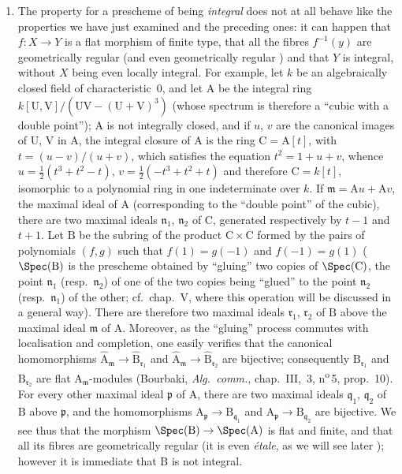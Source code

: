 \begin{remarks}[6.5.5]
\begin{enumerate}[label=(\roman*)]
  \item The property for a prescheme of being \emph{integral} does not at all behave like the properties we have just examined and the preceding ones: it can happen that $f:X\to Y$ is a flat morphism of finite type, that all the fibres $f^{-1}(y)$ are geometrically regular (and even geometrically regular ) and that $Y$ is integral, without $X$ being even locally integral.
For example, let $k$ be an algebraically closed field of characteristic~$0$, and let $\mathrm{A}$ be the integral ring $k[\mathrm{U},\mathrm{V}]/(\mathrm{U}\mathrm{V}-(\mathrm{U}+\mathrm{V})^3)$ (whose spectrum is therefore a ``cubic with a double point''); $\mathrm{A}$ is not integrally closed, and if $u$, $v$ are the canonical images of $\mathrm{U}$, $\mathrm{V}$ in $\mathrm{A}$, the integral closure of $\mathrm{A}$ is the ring $\mathrm{C}=\mathrm{A}[t]$, with $t=(u-v)/(u+v)$, which satisfies the equation $t^2=1+u+v$, whence $u=\frac{1}{2}(t^3+t^2-t)$, $v=\frac{1}{2}(-t^3+t^2+t)$ and therefore $\mathrm{C}=k[t]$, isomorphic to a polynomial ring in one indeterminate over $k$.
If $\mathfrak{m}=\mathrm{A} u+\mathrm{A} v$, the maximal ideal of $\mathrm{A}$ (corresponding to the ``double point'' of the cubic), there are two maximal ideals $\mathfrak{n}_1$, $\mathfrak{n}_2$ of $\mathrm{C}$, generated respectively by $t-1$ and $t+1$.
Let $\mathrm{B}$ be the subring of the product $\mathrm{C}\times\mathrm{C}$ formed by the pairs of polynomials $(f,g)$ such that $f(1)=g(-1)$ and $f(-1)=g(1)$ ($\Spec(\mathrm{B})$ is the prescheme obtained by ``gluing'' two copies of $\Spec(\mathrm{C})$, the point $\mathfrak{n}_1$ (resp.\ $\mathfrak{n}_2$) of one of the two copies being ``glued'' to the point $\mathfrak{n}_2$ (resp.\ $\mathfrak{n}_1$) of the other; cf.\ chap.~V, where this operation will be discussed in a general way).
There are therefore two maximal ideals $\mathfrak{r}_1$, $\mathfrak{r}_2$ of $\mathrm{B}$ above the maximal ideal $\mathfrak{m}$ of $\mathrm{A}$.
Moreover, as the ``gluing'' process commutes with localisation and completion, one easily verifies that the canonical homomorphisms $\hat{\mathrm{A}}_\mathfrak{m}\to\hat{\mathrm{B}}_{\mathfrak{r}_1}$ and $\hat{\mathrm{A}}_\mathfrak{m}\to\hat{\mathrm{B}}_{\mathfrak{r}_2}$ are bijective; consequently $\mathrm{B}_{\mathfrak{r}_1}$ and $\mathrm{B}_{\mathfrak{r}_2}$ are flat $\mathrm{A}_\mathfrak{m}$-modules (Bourbaki, \emph{Alg.\ comm.}, chap.~III, \textsection\,3, n\textsuperscript{o}\,5, prop.~10).
For every other maximal ideal $\mathfrak{p}$ of $\mathrm{A}$, there are two maximal ideals $\mathfrak{q}_1$, $\mathfrak{q}_2$ of $\mathrm{B}$ above $\mathfrak{p}$, and the homomorphisms $\mathrm{A}_\mathfrak{p}\to\mathrm{B}_{\mathfrak{q}_1}$ and $\mathrm{A}_\mathfrak{p}\to\mathrm{B}_{\mathfrak{q}_2}$ are bijective.
We see thus that the morphism $\Spec(\mathrm{B})\to\Spec(\mathrm{A})$ is flat and finite, and that all its fibres are geometrically regular (it is even \emph{\'etale}, as we will see later ); however it is immediate that $\mathrm{B}$ is not integral.
\end{enumerate}
\end{remarks}

